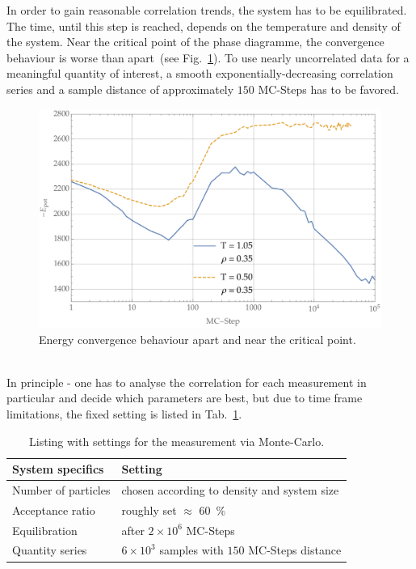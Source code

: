In order to gain reasonable correlation trends, the system has to be equilibrated.
The time, until this step is reached, depends on the temperature and density of the system.
Near the critical point of the phase diagramme, the convergence behaviour is worse than apart~(see Fig.~\ref{fig:MCEnergyConvergence}).
To use nearly uncorrelated data for a meaningful quantity of interest, a smooth exponentially-decreasing correlation series and a sample distance of approximately $150$ MC-Steps has to be favored.
\begin{figure}[ht]
	\includegraphics[width=\textwidth]{Figures/MCEnergyConvergence.pdf}
	\caption[MC: Energy Convergence Behaviour]{Energy convergence behaviour apart and near the critical point.}
	\label{fig:MCEnergyConvergence}
\end{figure}\\
In principle - one has to analyse the correlation for each measurement in particular and decide which parameters are best, but due to time frame limitations, the fixed setting is listed in Tab.~\ref{tbl:MCSettings}.
\begin{table}[ht]
	\centering
	\begin{tabular}{l | l}
		System specifics &Setting \\
		\hline
		Number of particles &chosen according to density and system size\\
		Acceptance ratio&roughly set $\approx$ \SI{60}{\percent}\\
		Equilibration&after $2\times10^6$ MC-Steps\\
		Quantity series&$6\times10^3$ samples with $150$ MC-Steps distance\\
	\end{tabular}
	\caption[MC: Settings]{Listing with settings for the measurement via Monte-Carlo.}
	\label{tbl:MCSettings}
\end{table}

